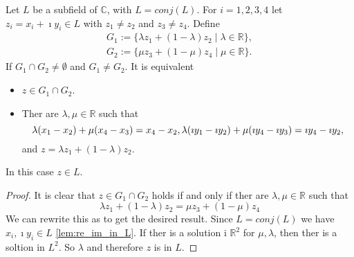 \begin{lemma}
    \label{Lem:Intersection_line_line}
    Let $L$ be a subfield of $\mathbb{C}$, with $L = conj(L)$. For $i = 1,2,3,4$ let $z_i = x_i + \imath y_i \in L$ with $z_1 \ne z_2$ and $z_3 \ne z_4$. Define
    \begin{equation*}\begin{aligned}
        G_1 := \{\lambda z_1 + (1-\lambda)z_2 \mid \lambda \in \mathbb{R}\},\\
        G_2 := \{\mu z_3 + (1-\mu)z_4 \mid \mu \in \mathbb{R}\}.
    \end{aligned} \end{equation*}
    If $G_1 \cap G_2 \ne \emptyset$ and $G_1 \ne G_2$. It is equivalent 
    \begin{itemize}
        \item $z\in G_1 \cap G_2$.
        \item Ther are $\lambda, \mu \in \mathbb{R}$ such that 
        $$\lambda(x_1 - x_2)+\mu(x_4-x_3) = x_4-x_2,\\
        \lambda(\imath y_1 - \imath y_2)+\mu(\imath y_4-\imath y_3) = \imath y_4-\imath y_2,$$
        and $z = \lambda z_1 + (1-\lambda)z_2$.
    \end{itemize}
    In this case $z \in L$.
\end{lemma}
\begin{proof}
    It is clear that $z\in G_1\cap G_2$ holds if and only if ther are $\lambda, \mu \in \mathbb{R}$ such that
    \begin{equation*}
        \lambda z_1 + (1-\lambda)z_2 = \mu z_3 + (1-\mu)z_4
    \end{equation*}
    We can rewrite this as to get the desired result. %
    Since $L = conj(L)$ we have $x_i, \imath y_i \in L$ \ref{lem:re_im_in_L}. 
    If ther is a solution i $\mathbb{R}^2$ for $\mu, \lambda$, then ther is a soltion in $L^2$.
    So $\lambda$ and therefore $z$ is in $L$.
\end{proof}

